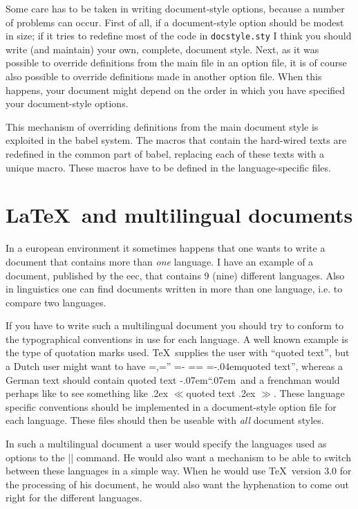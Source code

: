 \documentclass{ltugboat}
\makeatletter
\newcommand{\file}[1]{\texttt{#1}}
\newcommand{\babel}{\textsf{babel}}
\gdef\dlqq{{\setbox\tw@=\hbox{,}\setbox\z@=\hbox{''}%
  \dimen\z@=\ht\z@ \advance\dimen\z@-\ht\tw@
  \setbox\z@=\hbox{\lower\dimen\z@\box\z@}\ht\z@=\ht\tw@
  \dp\z@=\dp\tw@ \box\z@\kern-.04em}}
\def\allowhyphens{\penalty\@M \hskip\z@skip}
\def\set@low@box#1{\setbox\tw@\hbox{,}\setbox\z@\hbox{#1}\dimen\z@\ht\z@
     \advance\dimen\z@ -\ht\tw@
     \setbox\z@\hbox{\lower\dimen\z@ \box\z@}\ht\z@\ht\tw@ \dp\z@\dp\tw@ }
\def\@glqq{{\ifhmode \edef\@SF{\spacefactor\the\spacefactor}\else
     \let\@SF\empty \fi \leavevmode
     \set@low@box{''}\box\z@\kern-.04em\allowhyphens\@SF\relax}}
\def\glqq{\protect\@glqq}
\def\@grqq{\ifhmode \edef\@SF{\spacefactor\the\spacefactor}\else
     \let\@SF\empty \fi \kern-.07em``\kern.07em\@SF\relax}
\def\grqq{\protect\@grqq}
\def\@flqq{\ifhmode \edef\@SF{\spacefactor\the\spacefactor}\else
     \let\@SF\empty \fi
     \ifmmode \ll \else \leavevmode
     \raise .2ex \hbox{$\scriptscriptstyle \ll $}\fi \@SF\relax}
\def\flqq{\protect\@flqq}
\def\@frqq{\ifhmode \edef\@SF{\spacefactor\the\spacefactor}\else
     \let\@SF\empty \fi
     \ifmmode \gg \else \leavevmode
     \raise .2ex \hbox{$\scriptscriptstyle \gg $}\fi \@SF\relax}
\def\frqq{\protect\@frqq}
\makeatother
\begin{document}
Some care has to be taken in writing document-style options, because a
number of problems can occur. First of all, if a document-style option
should be modest in size; if it tries to redefine most of the code in
\file{docstyle.sty} I think you should write (and maintain) your own,
complete, document style.  Next, as it was possible to override
definitions from the main file in an option file, it is of course also
possible to override definitions made in another option file. When
this happens, your document might depend on the order in which you
have specified your document-style options.

This mechanism of overriding definitions from the main document style
is exploited in the \babel{} system. The macros that contain the
hard-wired texts are redefined in the common part of \babel{},
replacing each of these texts with a unique macro. These macros have
to be defined in the language-specific files.

\section{\LaTeX\ and multilingual documents}\label{lat-lingual}

In a european environment it sometimes happens that one wants to write
a document that contains more than \emph{one} language. I have an
example of a document, published by the {\sc eec}, that contains 9
(nine) different languages. Also in linguistics one can find documents
written in more than one language, i.e. to compare two languages.

If you have to write such a multilingual document you should try to
conform to the typographical conventions in use for each language. A
well known example is the type of quotation marks used. \TeX\ supplies
the user with ``quoted text'', but a Dutch user might want to have
\dlqq quoted text'', whereas a German text should contain \glqq quoted
text\grqq\ and a frenchman would perhaps like to see something like
\flqq quoted text\frqq. These language specific conventions should be
implemented in a document-style option file for each language. These
files should then be useable with \emph{all} document styles.

In such a multilingual document a user would specify the languages
used as options to the |\documentstyle| command. He would also want a
mechanism to be able to switch between these languages in a simple
way. When he would use \TeX\ version 3.0 for the processing of his
document, he would also want the hyphenation to come out right for the
different languages.
\end{document}
